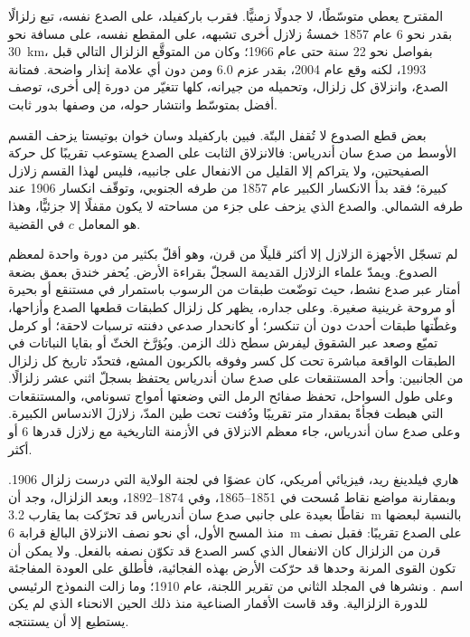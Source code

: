 المقترح يعطي متوسّطًا، لا جدولًا زمنيًّا. فقرب باركفيلد، على الصدع نفسه، تبع زلزالًا بقدر نحو 6 عام 1857 خمسةُ زلازل أخرى تشبهه، على المقطع نفسه، على مسافة نحو \qty{30}{km}، بفواصل نحو 22 سنة حتى عام 1966؛ وكان من المتوقَّع الزلزال التالي قبل 1993، لكنه وقع عام 2004، بقدر عزم 6.0 ومن دون أي علامة إنذار واضحة. فمتانة الصدع، وانزلاق كل زلزال، وتحميله من جيرانه، كلها تتغيّر من دورة إلى أخرى،  توصف أفضل بمتوسّط  وانتشار حوله، من وصفها بدور ثابت.

بعض قطع الصدوع لا تُقفل البتّة. فبين باركفيلد وسان خوان بوتيستا يزحف القسم الأوسط من صدع سان أندرياس: فالانزلاق الثابت على الصدع يستوعب تقريبًا كل حركة الصفيحتين، ولا يتراكم إلا القليل من الانفعال على جانبيه، فليس لهذا القسم زلازل كبيرة؛ فقد بدأ الانكسار الكبير عام 1857 من طرفه الجنوبي، وتوقّف انكسار 1906 عند طرفه الشمالي. والصدع الذي يزحف على جزء من مساحته لا يكون مقفلًا إلا جزئيًّا، وهذا هو المعامل $c$ في القضية.

\begin{inthefield}
لم تسجّل الأجهزة الزلازل إلا أكثر قليلًا من قرن، وهو أقلّ بكثير من دورة واحدة لمعظم الصدوع. ويمدّ علماء الزلازل القديمة السجلّ بقراءة الأرض. يُحفر خندق بعمق بضعة أمتار عبر صدع نشط، حيث توضّعت طبقات من الرسوب باستمرار في مستنقع أو بحيرة أو مروحة غرينية صغيرة. وعلى جداره، يظهر كل زلزال كطبقات قطعها الصدع وأزاحها، وغطّتها طبقات أحدث دون أن تنكسر؛ أو كانحدار صدعي دفنته ترسبات لاحقة؛ أو كرمل تميّع وصعد عبر الشقوق ليفرش سطح ذلك الزمن. ويُؤرَّخ الخثّ أو بقايا النباتات في الطبقات الواقعة مباشرة تحت كل كسر وفوقه بالكربون المشع، فتحدّد تاريخ كل زلزال من الجانبين: وأحد المستنقعات على صدع سان أندرياس يحتفظ بسجلّ اثني عشر زلزالًا. وعلى طول السواحل، تحفظ صفائح الرمل التي وضعتها أمواج تسونامي، والمستنقعات التي هبطت فجأةً بمقدار متر تقريبًا ودُفنت تحت طين المدّ، زلازلَ الاندساس الكبيرة. وعلى صدع سان أندرياس، جاء معظم الانزلاق في الأزمنة التاريخية مع زلازل قدرها 6 أو أكثر.
\end{inthefield}

\begin{history}
هاري فيلدينغ ريد، فيزيائي أمريكي، كان عضوًا في لجنة الولاية التي درست زلزال 1906. وبمقارنة مواضع نقاط مُسحت في 1851--1865، وفي 1874--1892، وبعد الزلزال، وجد أن نقاطًا بعيدة على جانبي صدع سان أندرياس قد تحرّكت بما يقارب \qty{3.2}{m} بالنسبة لبعضها منذ المسح الأول، أي نحو نصف الانزلاق البالغ قرابة \qty{6}{m} على الصدع تقريبًا: فقبل نصف قرن من الزلزال كان الانفعال الذي كسر الصدع قد تكوّن نصفه بالفعل. ولا يمكن أن تكون القوى المرنة وحدها قد حرّكت الأرض بهذه الفجائية، فأطلق على العودة المفاجئة اسم . ونشرها في المجلد الثاني من تقرير اللجنة، عام 1910؛ وما زالت النموذج الرئيسي للدورة الزلزالية. وقد قاست الأقمار الصناعية منذ ذلك الحين الانحناء الذي لم يكن يستطيع إلا أن يستنتجه.
\end{history}


